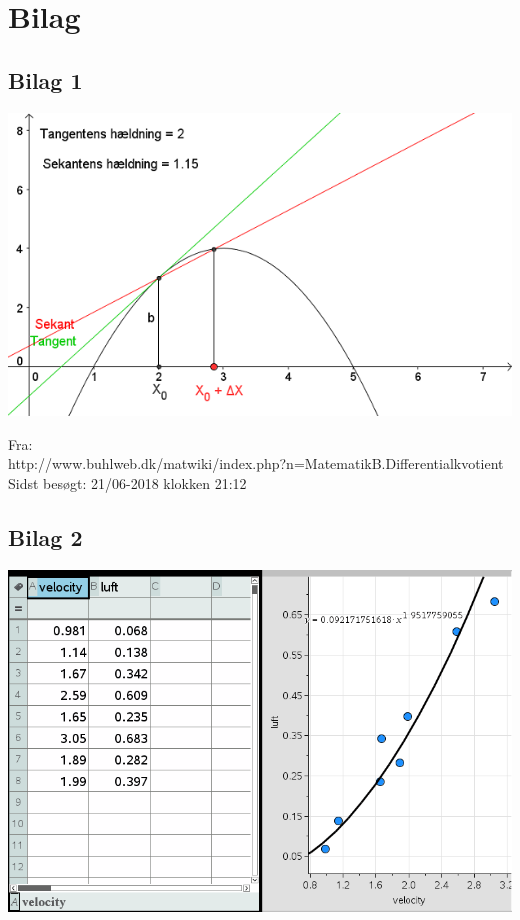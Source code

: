 \documentclass[12pt]{article}
\begin{document}
\section{Bilag}
\subsection*{Bilag 1}
\begin{center}
  \includegraphics[width=\linewidth]{tangentogsekant.png}
\end{center}
Fra:\\ http://www.buhlweb.dk/matwiki/index.php?n=MatematikB.Differentialkvotient\\
Sidst besøgt: 21/06-2018 klokken 21:12

\subsection*{Bilag 2}
\begin{center}
\includegraphics[width=\linewidth]{Ligningforluftmodstand.png}
\end{center}
\end{document}

